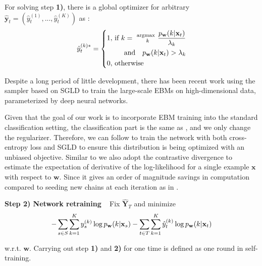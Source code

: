 \documentclass[a4paper,conference]{IEEEtran}
\theoremstyle{plain}%
\begin{document}
For solving step \textbf{1)}, there is a global optimizer for arbitrary $\hat{\mathbf{y}}_t=(\hat{y}_t^{(1)},...,\hat{y}_t^{(K)})$ as \cite{zou2019confidence}:
\begin{equation}
\hat{y}_{t}^{(k)*}=\left\{
\begin{aligned}
1, &~\text{if}~k={~}^{\rm argmax}_{~~~~k}~{\frac {p_\mathbf{w}(k|{\mathbf{x}_{t}})}{\lambda_k}}\\
& ~~~~~ \text{and} ~~~ p_\mathbf{w}(k|\mathbf{x}_t)>\lambda_k\\
0, &~\mathrm{otherwise}
\end{aligned}
\right.\label{cbst_a_solver}
\end{equation} 


Despite a long period of little development, there has been recent work \cite{du2019implicit,nijkamp2019learning} using the sampler based on SGLD to train the large-scale EBMs on high-dimensional data, parameterized by deep neural networks.

Given that the goal of our work is to incorporate EBM training into the standard classification setting, the classification part is the same as \cite{zou2019confidence}, and we only change the regularizer. Therefore, we can follow \cite{grathwohl2019your} to train the network with both cross-entropy loss and SGLD to ensure this distribution is being optimized with an unbiased objective. Similar to \cite{du2019implicit} we also adopt the contrastive divergence to estimate the expectation of derivative of the log-likelihood for a single example $\mathbf{x}$ with respect to $\mathbf{w}$. Since it gives an order of magnitude savings in computation compared to seeding new chains at each iteration as in \cite{nijkamp2019learning}.\vspace{+5pt}

\noindent \textbf{Step 2) Network retraining} \label{b)} ~ Fix $\hat{\mathbf{Y}}_T$ and minimize \begin{align}\tiny\label{cbst_b}
-\sum\limits_{{{s}}\in {{S}}}{\sum\limits_{k=1}^{K}{y_{s}^{(k)}}\log p_\mathbf{w}(k|{\mathbf{x}_{s}})}-\sum\limits_{{{t}}\in {{T}}}{\sum\limits_{k=1}^{K}{\hat{y}_{t}^{(k)}}\log p_\mathbf{w}(k|{\mathbf{x}_{t}})} 
\end{align} 



\noindent w.r.t. $\mathbf{w}$. Carrying out step \textbf{1)} and \textbf{2)} for one time is defined as one round in self-training. 
\end{document}

